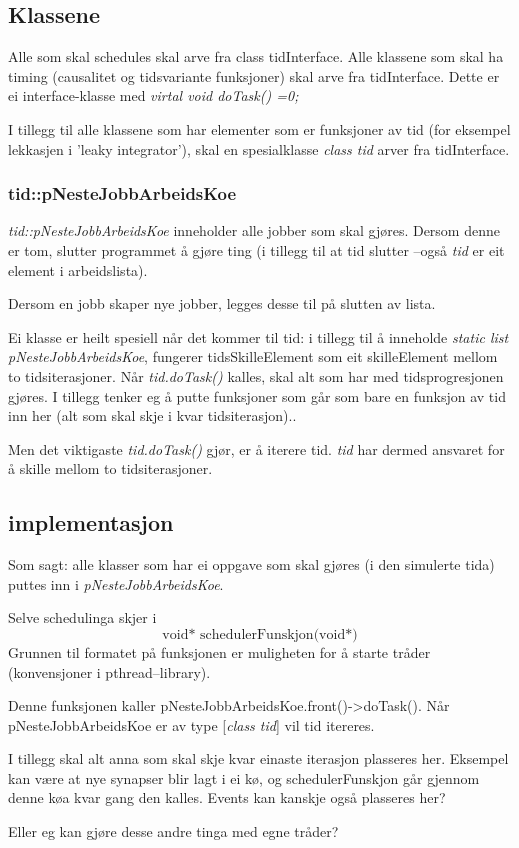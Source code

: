 \subsection{Klassene}
Alle som skal schedules skal arve fra class tidInterface. Alle klassene som skal ha timing (causalitet og tidsvariante funksjoner) skal arve fra tidInterface. 
Dette er ei interface-klasse med \emph{virtal void doTask() =0;}

I tillegg til alle klassene som har elementer som er funksjoner av tid (for eksempel lekkasjen i 'leaky integrator'), skal en spesialklasse \emph{class tid} arver fra tidInterface.

\subsubsection{tid::pNesteJobbArbeidsKoe}
\emph{tid::pNesteJobbArbeidsKoe} inneholder alle jobber som skal gjøres. Dersom denne er tom, slutter programmet å gjøre ting (i tillegg til at tid slutter --også \emph{tid} er eit element i arbeidslista).

Dersom en jobb skaper nye jobber, legges desse til på slutten av lista.

Ei klasse er heilt spesiell når det kommer til tid: i tillegg til å inneholde \emph{static list pNesteJobbArbeidsKoe}, fungerer tidsSkilleElement som eit skilleElement mellom to tidsiterasjoner. 
Når \emph{tid.doTask()} kalles, skal alt som har med tidsprogresjonen gjøres. I tillegg tenker eg å putte funksjoner som går som bare en funksjon av tid inn her (alt som skal skje i kvar tidsiterasjon)..

Men det viktigaste \emph{tid.doTask()} gjør, er å iterere tid.
\emph{tid} har dermed ansvaret for å skille mellom to tidsiterasjoner.

\subsection{implementasjon}
Som sagt: alle klasser som har ei oppgave som skal gjøres (i den simulerte tida) puttes inn i \emph{pNesteJobbArbeidsKoe}. 

Selve schedulinga skjer i 
\begin{equation}
	\text{void* schedulerFunskjon(void*)}
\end{equation}
Grunnen til formatet på funksjonen er muligheten for å starte tråder (konvensjoner i pthread--library).

Denne funksjonen kaller pNesteJobbArbeidsKoe.front()->doTask(). Når pNesteJobbArbeidsKoe er av type [\emph{class tid}] vil tid itereres.

I tillegg skal alt anna som skal skje kvar einaste iterasjon plasseres her. Eksempel kan være at nye synapser blir lagt i ei kø, og schedulerFunskjon går gjennom denne køa kvar gang den kalles. 
Events kan kanskje også plasseres her?

Eller eg kan gjøre desse andre tinga med egne tråder?

